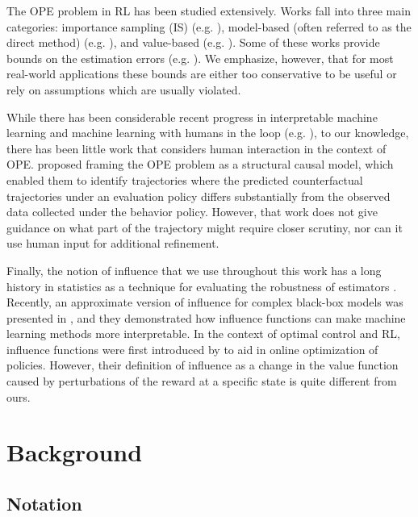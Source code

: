 \documentclass{article}
\begin{document}
The OPE problem in RL has been studied extensively.  Works fall into three main categories: importance sampling (IS) (e.g. \citet{precup2000eligibility, jiang2015doubly}), model-based (often referred to as the direct method) (e.g. \citet{hanna2017bootstrapping, gottesman2019combining}), and value-based (e.g. \citet{le2019batch}). Some of these works provide bounds on the estimation errors (e.g. \citet{thomas2015high, dann2018policy}). We emphasize, however, that for most real-world applications these bounds are either too conservative to be useful or rely on assumptions which are usually violated.

While there has been considerable recent progress in interpretable machine learning and machine learning with humans in the loop (e.g. \citet{tamuz2011adaptively, lage2018human}), to our knowledge, there has been little work that considers human interaction in the context of OPE. \citet{oberst2019counterfactual} proposed framing the OPE problem as a structural causal model, which enabled them to identify trajectories where the predicted counterfactual trajectories under an evaluation policy differs substantially from the observed data collected under the behavior policy. However, that work does not give guidance on what part of the trajectory might require closer scrutiny, nor can it use human input for additional refinement. 

Finally, the notion of influence that we use throughout this work has a long history in statistics as a technique for evaluating the robustness of estimators \citep{cook1980characterizations}.  Recently, an approximate version of influence for complex black-box models was presented in \citet{koh2017understanding}, and they demonstrated how influence functions can make machine learning methods more interpretable. In the context of optimal control and RL, influence functions were first introduced by \citet{munos2002variable} to aid in online optimization of policies. However, their definition of influence as a change in the value function caused by perturbations of the reward at a specific state is quite different from ours. 

\section{Background}

\subsection{Notation}
\end{document}
